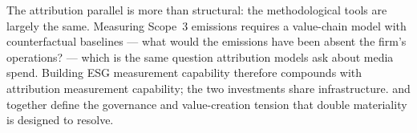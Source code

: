 The attribution parallel is more than structural: the methodological tools are largely the
same. Measuring Scope~3 emissions requires a value-chain model with counterfactual baselines —
what would the emissions have been absent the firm's operations? — which is the same question
attribution models ask about media spend. Building ESG measurement capability therefore
compounds with attribution measurement capability; the two investments share infrastructure.
\textcite{freeman2010strategic} and \textcite{jensen1976agency} together define the
governance and value-creation tension that double materiality is designed to resolve.
